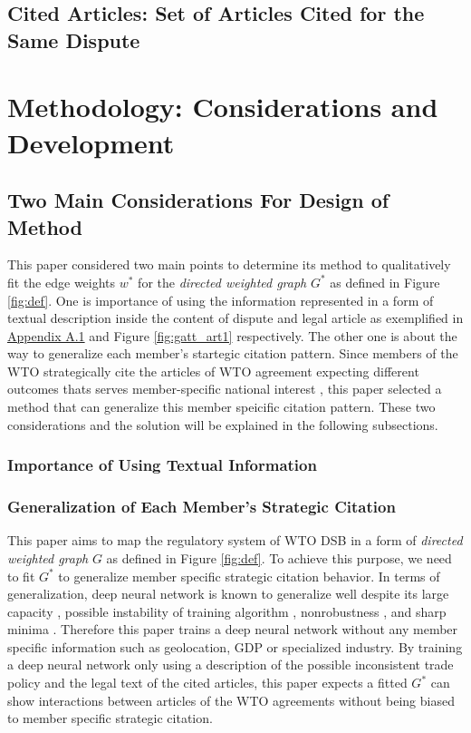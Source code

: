 \documentclass[12pt,letterpaper]{article}
\begin{document}
\subsection{Cited Articles: Set of Articles Cited for the Same Dispute}


\section{Methodology: Considerations and Development}


\subsection{Two Main Considerations For Design of Method} \label{justification-nn}
This paper considered two main points to
determine its method to qualitatively fit the edge weights $w^*$ for the \textit{directed weighted graph} $G^*$ as defined in Figure \ref{fig:def}. One is importance of using the information represented in a form of textual description inside the content of dispute and legal article as exemplified in \hyperref[sub:factual-aspect-example]{Appendix A.1} and Figure {\ref{fig:gatt_art1}} respectively. The other one is about the way to generalize each member's startegic citation pattern. Since members of the WTO strategically cite
the articles of WTO agreement expecting different outcomes thats serves member-specific national interest \citep{who_gets, pelc, latent}, this paper
selected a method that can generalize this member speicific citation pattern. These two considerations and the solution will be explained in the following subsections.

\subsubsection{Importance of Using Textual Information}


\subsubsection{Generalization of Each Member's Strategic Citation}

This paper aims to map the regulatory system of WTO DSB in a form of \textit{directed weighted graph} $G$ as defined in Figure \ref{fig:def}.
To achieve this purpose, we need to fit $G^{*}$ to generalize member specific strategic citation behavior.
In terms of generalization, deep neural network is known to generalize well despite
its large capacity \citep{neyshabur2017exploring}, possible instability of training algorithm \citep{charles2017stability}, nonrobustness \citep{zahavy2017ensemble}, and sharp minima \citep{dinh2017sharp}.
Therefore this paper trains a deep neural network without any member specific information such as geolocation, GDP or specialized industry. By training a deep neural network only using a description of the possible inconsistent trade policy and the legal text of the cited articles,
this paper expects a fitted $G^{*}$ can show interactions between articles of the WTO agreements
without being biased to member specific strategic citation.
\end{document}
